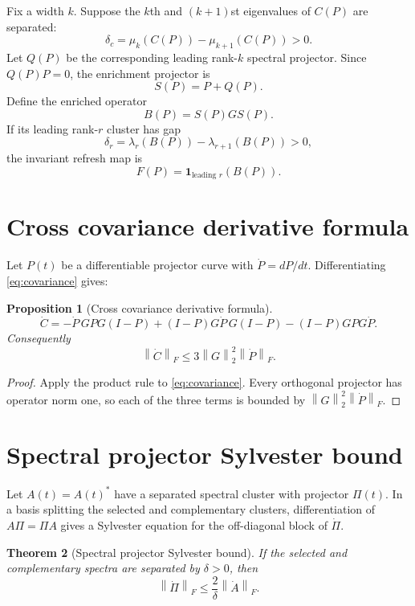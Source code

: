 \documentclass[11pt]{article}
\newtheorem{theorem}{Theorem}[section]
\newtheorem{proposition}[theorem]{Proposition}
\theoremstyle{definition}
\theoremstyle{remark}
\newcommand{\norm}[1]{\left\lVert#1\right\rVert}
\begin{document}
Fix a width $k$.  Suppose the $k$th and $(k+1)$st eigenvalues of $C(P)$ are
separated:
\[
 \delta_c=\mu_k(C(P))-\mu_{k+1}(C(P))>0.
\]
Let $Q(P)$ be the corresponding leading rank-$k$ spectral projector.  Since
$Q(P)P=0$, the enrichment projector is
\[
 S(P)=P+Q(P).
\]
Define the enriched operator
\[
 B(P)=S(P)GS(P).
\]
If its leading rank-$r$ cluster has gap
\[
 \delta_r=\lambda_r(B(P))-\lambda_{r+1}(B(P))>0,
\]
the invariant refresh map is
\begin{equation}
 F(P)=\mathbf 1_{\text{leading }r}(B(P)).
 \label{eq:refresh}
\end{equation}

\section{Cross covariance derivative formula}
\label{sec:cross}

Let $P(t)$ be a differentiable projector curve with $\dot P=dP/dt$.
Differentiating \eqref{eq:covariance} gives:

\begin{proposition}[Cross covariance derivative formula]
\label{prop:cross}
\begin{equation}
 \dot C
 =-\dot P\,GPG(I-P)
 +(I-P)G\dot P\,G(I-P)
 -(I-P)GPG\dot P.
 \label{eq:cross-derivative}
\end{equation}
Consequently
\begin{equation}
 \norm{\dot C}_F
 \le3\norm G_2^2\norm{\dot P}_F.
 \label{eq:cross-bound}
\end{equation}
\end{proposition}

\begin{proof}
Apply the product rule to \eqref{eq:covariance}.  Every orthogonal projector
has operator norm one, so each of the three terms is bounded by
$\norm G_2^2\norm{\dot P}_F$.
\end{proof}

\section{Spectral projector Sylvester bound}
\label{sec:sylvester}

Let $A(t)=A(t)^*$ have a separated spectral cluster with projector $\Pi(t)$.
In a basis splitting the selected and complementary clusters, differentiation
of $A\Pi=\Pi A$ gives a Sylvester equation for the off-diagonal block of
$\dot\Pi$.

\begin{theorem}[Spectral projector Sylvester bound]
\label{thm:sylvester}
If the selected and complementary spectra are separated by $\delta>0$, then
\begin{equation}
 \norm{\dot\Pi}_F
 \le\frac{2}{\delta}\norm{\dot A}_F.
 \label{eq:sylvester}
\end{equation}
\end{theorem}
\end{document}
